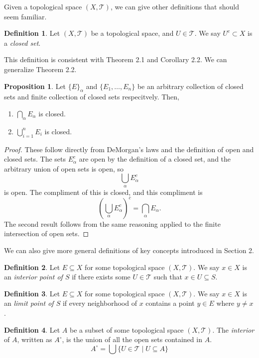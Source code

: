 \documentclass{article}
\newcommand{\T}{\mathcal{T}}
\theoremstyle{definition}
\newtheorem{proposition}{Proposition}[section]
\newtheorem{definition}{Definition}[section]
\begin{document}
	Given a topological space $(X,\T)$, we can give other definitions that should seem familiar.
	
		\begin{definition}\label{def}
		Let $(X,\T)$ be a topological space, and $U\in \mathcal T$. We say $U^c\subset X$ is a \textit{\color{red}closed set}.
	\end{definition}
	This definition is consistent with Theorem 2.1 and Corollary 2.2. We can generalize Theorem 2.2.
	\begin{proposition}
		Let $\{E\}_\alpha$ and $\{E_1,\ldots,E_n\}$ be an arbitrary collection of closed sets and finite collection of closed sets respecitvely. Then,
		\begin{enumerate}
			\item $\bigcap_\alpha E_\alpha$ is closed.
			\item $\bigcup_{i=1}^n E_i$ is closed.
		\end{enumerate}
	\end{proposition}
	\begin{proof}
		These follow directly from DeMorgan's laws and the definition of open and closed sets. The sets $E_\alpha^c$ are open by the definition of a closed set, and the arbitrary union of open sets is open, so
		$$ \bigcup_\alpha E_\alpha^c $$ is open. The compliment of this is closed, and this compliment is 
		$$ \left(\bigcup_\alpha E_\alpha^c\right)^c =  \bigcap_\alpha E_\alpha.$$
		The second result follows from the same reasoning applied to the finite intersection of open sets.
	\end{proof}
	
	We can also give more general definitions of key concepts introduced in Section 2.
	
	
	\begin{definition}
		Let $E\subseteq X$ for some topological space $(X,\T)$. We say $x\in X$ is an \textit{\color{red}interior point of $S$} if there exists some $U\in \T$ such that $x\in U\subseteq S$. 
	\end{definition}
		\begin{definition}
		Let $E\subseteq X$ for some topological space $(X,\T)$. We say $x\in X$ is an \textit{\color{red}limit point of $S$} if every neighborhood of $x$ contains a point $y\in E$ where $y\neq x$.
	\end{definition}
	
	\begin{definition}\label{def}
		Let $A$ be a subset of some topological space $(X,\T)$. The  \textit{\color{red}interior} of $A$, written as  $A^\circ$, is the union of all the open sets contained in $A$.
		$$A^\circ = \bigcup\{U\in\mathcal T\mid U\subseteq A\}$$
	\end{definition}
	
\end{document}
